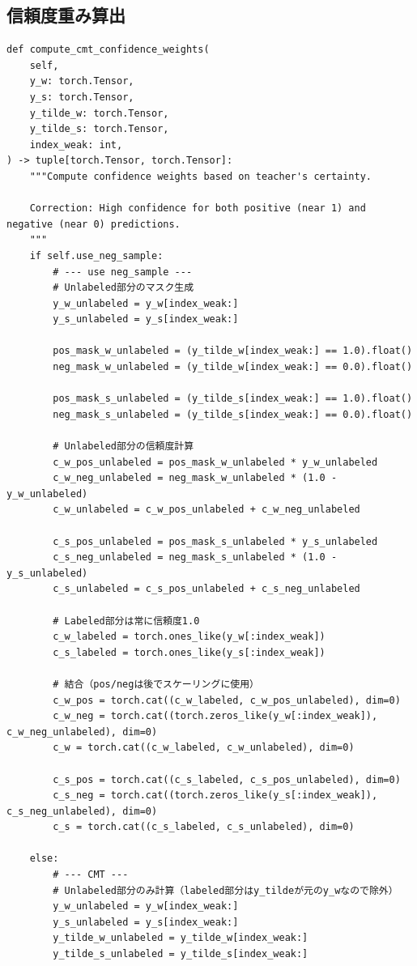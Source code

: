 \documentclass[../main.tex]{subfiles}
\begin{document}
\subsection{信頼度重み算出}
\begin{verbatim}
def compute_cmt_confidence_weights(
    self,
    y_w: torch.Tensor,
    y_s: torch.Tensor,
    y_tilde_w: torch.Tensor,
    y_tilde_s: torch.Tensor,
    index_weak: int,
) -> tuple[torch.Tensor, torch.Tensor]:
    """Compute confidence weights based on teacher's certainty.

    Correction: High confidence for both positive (near 1) and negative (near 0) predictions.
    """
    if self.use_neg_sample:
        # --- use neg_sample ---
        # Unlabeled部分のマスク生成
        y_w_unlabeled = y_w[index_weak:]
        y_s_unlabeled = y_s[index_weak:]

        pos_mask_w_unlabeled = (y_tilde_w[index_weak:] == 1.0).float()
        neg_mask_w_unlabeled = (y_tilde_w[index_weak:] == 0.0).float()

        pos_mask_s_unlabeled = (y_tilde_s[index_weak:] == 1.0).float()
        neg_mask_s_unlabeled = (y_tilde_s[index_weak:] == 0.0).float()

        # Unlabeled部分の信頼度計算
        c_w_pos_unlabeled = pos_mask_w_unlabeled * y_w_unlabeled
        c_w_neg_unlabeled = neg_mask_w_unlabeled * (1.0 - y_w_unlabeled)
        c_w_unlabeled = c_w_pos_unlabeled + c_w_neg_unlabeled

        c_s_pos_unlabeled = pos_mask_s_unlabeled * y_s_unlabeled
        c_s_neg_unlabeled = neg_mask_s_unlabeled * (1.0 - y_s_unlabeled)
        c_s_unlabeled = c_s_pos_unlabeled + c_s_neg_unlabeled

        # Labeled部分は常に信頼度1.0
        c_w_labeled = torch.ones_like(y_w[:index_weak])
        c_s_labeled = torch.ones_like(y_s[:index_weak])

        # 結合（pos/negは後でスケーリングに使用）
        c_w_pos = torch.cat((c_w_labeled, c_w_pos_unlabeled), dim=0)
        c_w_neg = torch.cat((torch.zeros_like(y_w[:index_weak]), c_w_neg_unlabeled), dim=0)
        c_w = torch.cat((c_w_labeled, c_w_unlabeled), dim=0)

        c_s_pos = torch.cat((c_s_labeled, c_s_pos_unlabeled), dim=0)
        c_s_neg = torch.cat((torch.zeros_like(y_s[:index_weak]), c_s_neg_unlabeled), dim=0)
        c_s = torch.cat((c_s_labeled, c_s_unlabeled), dim=0)

    else:
        # --- CMT ---
        # Unlabeled部分のみ計算（labeled部分はy_tildeが元のy_wなので除外）
        y_w_unlabeled = y_w[index_weak:]
        y_s_unlabeled = y_s[index_weak:]
        y_tilde_w_unlabeled = y_tilde_w[index_weak:]
        y_tilde_s_unlabeled = y_tilde_s[index_weak:]


\end{verbatim}
\end{document}
